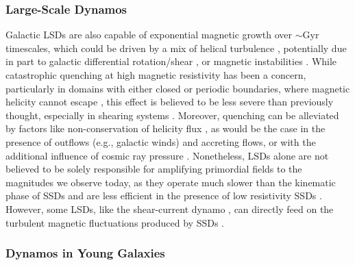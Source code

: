 \documentclass[12pt,twoside]{extreport}
\newcommand{\eg}{e.g.,\xspace} %
\begin{document}
\subsubsection{Large-Scale Dynamos}

Galactic LSDs are also capable of exponential magnetic growth over $\sim \mathrm{Gyr}$ timescales, which could be driven by a mix of helical turbulence \citep[\eg][]{bhat2016unified, rincon2021helical}, potentially due in part to galactic differential rotation/shear \citep[\eg][]{vishniac1997incoherent, kapyla2008large, squire2015generation, gent2023transition}, or magnetic instabilities \citep[\eg][]{johansen2008high, qazi2023nonlinear}. While catastrophic quenching at high magnetic resistivity has been a concern, particularly in domains with either closed or periodic boundaries, where magnetic helicity cannot escape \citep[see][]{vishniac2001magnetic}, this effect is believed to be less severe than previously thought, especially in shearing systems \citep{hubbard2012catastrophic}. Moreover, quenching can be alleviated by factors like non-conservation of helicity flux \citep{verma2003energy, sur2007galactic, del2013turbulent}, as would be the case in the presence of outflows (\eg galactic winds) and accreting flows, or with the additional influence of cosmic ray pressure \citep{parker1992fast, hanasz2004amplification}. Nonetheless, LSDs alone are not believed to be solely responsible for amplifying primordial fields to the magnitudes we observe today, as they operate much slower than the kinematic phase of SSDs \citep{schober2012magnetic, gent2023transition} and are less efficient in the presence of low resistivity SSDs \cite[\eg][]{gent2023transition}. However, some LSDs, like the shear-current dynamo \citep{squire2015generation}, can directly feed on the turbulent magnetic fluctuations produced by SSDs \citep[see][for a recent, thorough review of LSDs]{brandenburg2023galactic}.

\subsubsection{Dynamos in Young Galaxies}
\end{document}
